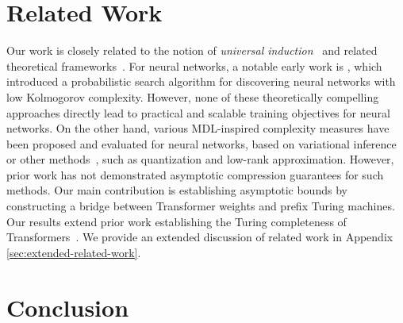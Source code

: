 \section{Related Work}
\label{sec:related-work}

Our work is closely related to the notion of \emph{universal induction}~\citep{solomonoff1964formal} and related theoretical frameworks~\citep{levin1973universal,hutter2000theory,lattimore2013no,achille2021information,nakkiran2021turing}. For neural networks, a notable early work is \citet{schmidhuber1997discovering}, which introduced a probabilistic search algorithm for discovering neural networks with low Kolmogorov complexity. However, none of these theoretically compelling approaches directly lead to practical and scalable training objectives for neural networks. On the other hand, various MDL-inspired complexity measures have been proposed and evaluated for neural networks, based on variational inference~\citep{hinton1993keeping,blundell2015weight,louizos2017bayesian,blier2018description} or other methods~\citep{li2018measuring,lotfi2022pac,lotfi2024non,demoss2025complexity,abudy2025minimum}, such as quantization and low-rank approximation.
However, prior work has not demonstrated asymptotic compression guarantees for such methods. %
Our main contribution is establishing asymptotic bounds by constructing a bridge between Transformer weights and prefix Turing machines. Our results extend prior work establishing the Turing completeness of Transformers~\citep{perez2021attention,nowak2024representational}.
We provide an extended discussion of related work in Appendix \ref{sec:extended-related-work}.

\section{Conclusion}

